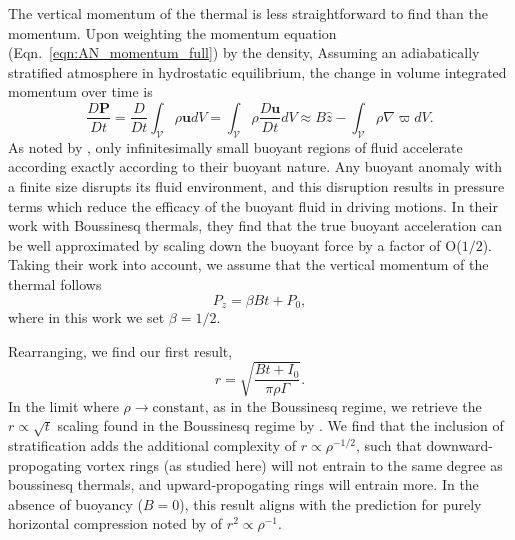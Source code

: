 \documentclass[twocolumn, amsmath, amsfonts, amssymb, trackchanges]{aastex62}
\newcommand{\grad}{\ensuremath{\nabla}}
\begin{document}
The vertical momentum of the thermal is less straightforward to find than the momentum. 
Upon weighting the momentum equation (Eqn.~\ref{eqn:AN_momentum_full}) by the density, 
Assuming an adiabatically stratified atmosphere in
hydrostatic equilibrium, the change in volume integrated momentum over time is
\begin{equation}
\frac{D \bm{P}}{Dt} = \frac{D}{Dt}\int_{\mathcal{V}}\rho\bm{u} dV
= \int_{\mathcal{V}} \rho\frac{D\bm{u}}{Dt} dV
\approx B\hat{z} - \int_{\mathcal{V}} \rho\grad\varpi dV.
\end{equation}
As noted by \citet{tarshish&all2018}, only infinitesimally small buoyant regions of
fluid accelerate according exactly according to their buoyant nature. Any buoyant anomaly
with a finite size disrupts its fluid environment, and this disruption results in
pressure terms which reduce the efficacy of the buoyant fluid in driving motions. 
In their work with Boussinesq thermals, they find that the true buoyant acceleration
can be well approximated by scaling down the buoyant force by a factor of O($1/2$).
Taking their work into account, we assume that the vertical momentum of the thermal
follows
\begin{equation}
P_z = \beta B t + P_0,
\end{equation}
where in this work we set $\beta = 1/2$.

Rearranging, we find our first result,
\begin{equation}
r = \sqrt{\frac{B t + I_0}{\pi\rho\Gamma}}.
\label{eqn:r_theory}
\end{equation}
In the limit where $\rho \rightarrow \text{constant}$, as in the Boussinesq regime,
we retrieve the $r \propto \sqrt{t}$ scaling found in the Boussinesq regime by
\citet{lecoanet&jeevanjee2018}. We find that the inclusion of stratification adds the
additional complexity of $r \propto \rho^{-1/2}$, such that downward-propogating 
vortex rings (as studied here) will not entrain to the same degree as boussinesq thermals,
and upward-propogating rings will entrain more. In the absence of buoyancy ($B = 0$),
this result aligns with the prediction for purely horizontal compression noted by
\citet{brandenburg2016} of $r^2 \propto \rho^{-1}$.
\end{document}
